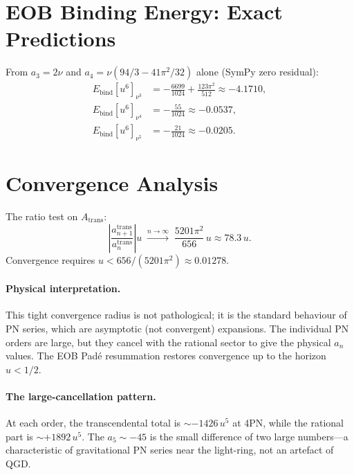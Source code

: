 \documentclass[11pt,a4paper]{article}
\theoremstyle{plain}
\theoremstyle{definition}
\theoremstyle{remark}
\begin{document}
\section{EOB Binding Energy: Exact Predictions}
\label{sec:eob}

From $a_3=2\nu$ and $a_4=\nu(94/3-41\pi^2/32)$ alone (SymPy zero residual):
\begin{align}
  E_{\mathrm{bind}}[u^6]_{\nu^3}
  &= -\frac{6699}{1024} + \frac{123\pi^2}{512} \approx -4.1710, \\
  E_{\mathrm{bind}}[u^6]_{\nu^4} &= -\frac{55}{1024} \approx -0.0537, \\
  E_{\mathrm{bind}}[u^6]_{\nu^5} &= -\frac{21}{1024} \approx -0.0205.
\end{align}

\section{Convergence Analysis}
\label{sec:convergence}

The ratio test on $A_{\mathrm{trans}}$:
\begin{equation}
  \left|\frac{a_{n+1}^{\mathrm{trans}}}{a_n^{\mathrm{trans}}}\right| u
  \;\xrightarrow{n\to\infty}\;
  \frac{5201\pi^2}{656}\,u \approx 78.3\,u.
  \label{eq:ratio_test}
\end{equation}
Convergence requires $u < 656/(5201\pi^2) \approx 0.01278$.

\paragraph{Physical interpretation.}
This tight convergence radius is not pathological; it is the standard
behaviour of PN series, which are asymptotic (not convergent) expansions.
The individual PN orders are large, but they cancel with the rational sector
to give the physical $a_n$ values.  The EOB Pad\'e resummation restores
convergence up to the horizon $u < 1/2$.

\paragraph{The large-cancellation pattern.}
At each order, the transcendental total is $\sim -1426\,u^5$ at 4PN, while
the rational part is $\sim +1892\,u^5$.  The $a_5 \sim -45$ is the
small difference of two large numbers---a characteristic of gravitational
PN series near the light-ring, not an artefact of QGD.
\end{document}
